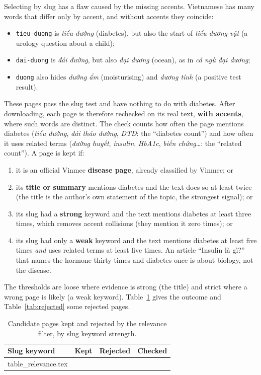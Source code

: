 \documentclass[11pt, a4paper]{article}
\makeatletter
\newcommand{\tabinput}[1]{\@@input #1 }   %
\newcommand{\code}[1]{\texttt{#1}}
\makeatother
\begin{document}
Selecting by slug has a flaw caused by the missing accents. Vietnamese has many words that differ only by accent, and without accents they coincide:
\begin{itemize}
    \item \code{tieu-duong} is \emph{tiểu đường} (diabetes), but also the start of \emph{tiểu dương vật} (a urology question about a child);
    \item \code{dai-duong} is \emph{đái đường}, but also \emph{đại dương} (ocean), as in \emph{cá ngừ đại dương};
    \item \code{duong} also hides \emph{dưỡng ẩm} (moisturising) and \emph{dương tính} (a positive test result).
\end{itemize}
These pages pass the slug test and have nothing to do with diabetes. After downloading, each page is therefore rechecked on its real text, \textbf{with accents}, where such words are distinct. The check counts how often the page mentions diabetes (\emph{tiểu đường}, \emph{đái tháo đường}, \emph{ĐTĐ}: the ``diabetes count'') and how often it uses related terms (\emph{đường huyết}, \emph{insulin}, \emph{HbA1c}, \emph{biến chứng}\ldots: the ``related count''). A page is kept if:

\begin{enumerate}
    \item it is an official Vinmec \textbf{disease page}, already classified by Vinmec; or
    \item its \textbf{title or summary} mentions diabetes and the text does so at least twice (the title is the author's own statement of the topic, the strongest signal); or
    \item its slug had a \textbf{strong} keyword and the text mentions diabetes at least three times, which removes accent collisions (they mention it zero times); or
    \item its slug had only a \textbf{weak} keyword and the text mentions diabetes at least five times \emph{and} uses related terms at least five times. An article ``Insulin là gì?'' that names the hormone thirty times and diabetes once is about biology, not the disease.
\end{enumerate}

The thresholds are loose where evidence is strong (the title) and strict where a wrong page is likely (a weak keyword). Table~\ref{tab:relevance} gives the outcome and Table~\ref{tab:rejected} some rejected pages.

\begin{table}[H]
\centering
\small
\caption{Candidate pages kept and rejected by the relevance filter, by slug keyword strength.}
\label{tab:relevance}
\begin{tabular}{lrrr}
\toprule
Slug keyword & Kept & Rejected & Checked \\
\midrule
\tabinput{table_relevance.tex}
\bottomrule
\end{tabular}
\end{table}
\end{document}
